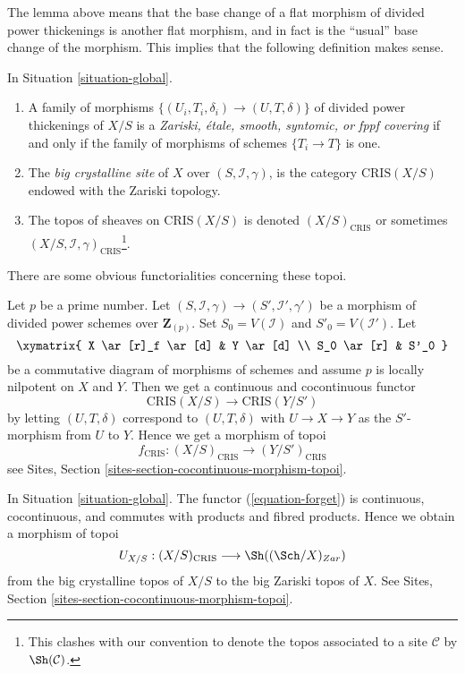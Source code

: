 \noindent
The lemma above means that the base change of a flat morphism
of divided power thickenings is another flat morphism, and in
fact is the ``usual'' base change of the morphism. This implies
that the following definition makes sense.

\begin{definition}
\label{definition-big-crystalline-site}
In Situation \ref{situation-global}.
\begin{enumerate}
\item A family of morphisms $\{(U_i, T_i, \delta_i) \to (U, T, \delta)\}$
of divided power thickenings of $X/S$ is a {\it Zariski, \'etale, smooth,
syntomic, or fppf covering} if and only if the family of morphisms
of schemes $\{T_i \to T \}$ is one.
\item The {\it big crystalline site} of $X$ over $(S, \mathcal{I}, \gamma)$,
is the category $\text{CRIS}(X/S)$ endowed with the Zariski topology.
\item The topos of sheaves on $\text{CRIS}(X/S)$ is denoted
$(X/S)_{\text{CRIS}}$ or sometimes
$(X/S, \mathcal{I}, \gamma)_{\text{CRIS}}$\footnote{This clashes with
our convention to denote the topos associated to a site $\mathcal{C}$
by $\Sh(\mathcal{C})$.}.
\end{enumerate}
\end{definition}

\noindent
There are some obvious functorialities concerning these topoi.

\begin{remark}[Functoriality]
\label{remark-functoriality-big-cris}
Let $p$ be a prime number.
Let $(S, \mathcal{I}, \gamma) \to (S', \mathcal{I}', \gamma')$ be a
morphism of divided power schemes over $\mathbf{Z}_{(p)}$.
Set $S_0 = V(\mathcal{I})$ and $S'_0 = V(\mathcal{I}')$.
Let
$$
\xymatrix{
X \ar[r]_f \ar[d] & Y \ar[d] \\
S_0 \ar[r] & S'_0
}
$$
be a commutative diagram of morphisms of schemes and assume $p$ is
locally nilpotent on $X$ and $Y$. Then we get a continuous and
cocontinuous functor
$$
\text{CRIS}(X/S) \longrightarrow \text{CRIS}(Y/S')
$$
by letting $(U, T, \delta)$ correspond to $(U, T, \delta)$
with $U \to X \to Y$ as the $S'$-morphism from $U$ to $Y$.
Hence we get a morphism of topoi
$$
f_{\text{CRIS}} : (X/S)_{\text{CRIS}} \longrightarrow (Y/S')_{\text{CRIS}}
$$
see Sites, Section \ref{sites-section-cocontinuous-morphism-topoi}.
\end{remark}

\begin{remark}
\label{remark-compare-big-zariski}
In Situation \ref{situation-global}.
The functor (\ref{equation-forget}) is continuous, cocontinuous, and
commutes with products and fibred products.
Hence we obtain a morphism of topoi
$$
U_{X/S} : (X/S)_{\text{CRIS}} \longrightarrow \Sh((\Sch/X)_{Zar})
$$
from the big crystalline topos of $X/S$ to the big Zariski topos of $X$.
See Sites, Section \ref{sites-section-cocontinuous-morphism-topoi}.
\end{remark}

